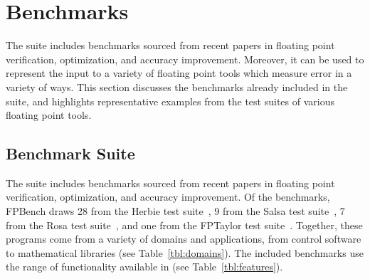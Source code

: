 \documentclass[main.tex]{subfiles}
\begin{document}
\section{Benchmarks}
\label{sec:casestudies}

The \name suite includes \nbenches benchmarks
  sourced from recent papers in floating point verification,
  optimization, and accuracy improvement.
Moreover, it can be used to represent the input
  to a variety of floating point tools
  which measure error in a variety of ways.
This section discusses the benchmarks
  already included in the \name suite,
  and highlights representative examples
  from the test suites of various floating point tools.

\subsection{Benchmark Suite}

The \name suite includes \nbenches benchmarks
  sourced from recent papers in floating point verification,
  optimization, and accuracy improvement.
Of the benchmarks,
  FPBench draws 28 from the Herbie test suite~\cite{pavel15},
  9 from the Salsa test suite~\cite{fmics15},
  7 from the Rosa test suite~\cite{DarulovaK14},
  and one from the FPTaylor test suite~\cite{fptaylor-fm15}.
Together, these programs come from
  a variety of domains and applications,
  from control software to mathematical libraries
  (see Table~\ref{tbl:domains}).
The included benchmarks use the range of functionality
  available in \name (see Table~\ref{tbl:features}).
\end{document}
